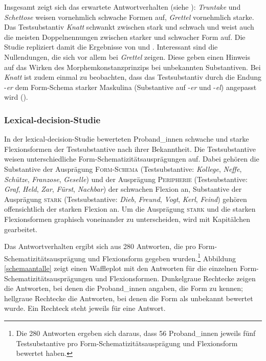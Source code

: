 \begin{sloppypar}
Insgesamt zeigt sich das erwartete Antwortverhalten (siehe ): \textit{Truntake} und \textit{Schettose} weisen vornehmlich schwache Formen auf, \textit{Grettel} vornehmlich starke. Das Testsubstantiv \textit{Knatt} schwankt zwischen stark und schwach und weist auch die meisten Doppelnennungen zwischen starker und schwacher Form auf. Die Studie repliziert damit die Ergebnisse von \textcite{Kopcke.2000b} und \textcite{Schmitt.2019}. Interessant sind die Nullendungen, die sich vor allem bei \textit{Grettel} zeigen. Diese geben einen Hinweis auf das Wirken des Morphemkonstanzprinzips bei unbekannten Substantiven. Bei \textit{Knatt} ist zudem einmal zu beobachten, dass das Testsubstantiv durch die Endung -\textit{er} dem Form-Schema starker Maskulina (Substantive auf -\textit{er} und -\textit{el}) angepasst wird (\cite[167--168]{Schmitt.2019}).
\end{sloppypar}

\subsubsection{Lexical-decision-Studie}\label{ergschemadecant}

In der lexical-decision-Studie bewerteten Proband\_innen schwache und starke Flexionsformen der Testsubstantive nach ihrer Bekanntheit. Die Testsubstantive weisen unterschiedliche Form-Schematizitätsausprägungen auf. Dabei gehören die Substantive der Ausprägung \textsc{Form-Schema} (Testsubstantive: \textit{Kollege}, \textit{Neffe}, \textit{Schütze}, \textit{Franzose}, \textit{Geselle}) und der Ausprägung \textsc{Peripherie} (Testsubstantive: \textit{Graf}, \textit{Held}, \textit{Zar}, \textit{Fürst}, \textit{Nachbar}) der schwachen Flexion an, Substantive der Ausprägung \textsc{stark} (Testsubstantive: \textit{Dieb}, \textit{Freund}, \textit{Vogt}, \textit{Kerl}, \textit{Feind}) gehören offensichtlich der starken Flexion an. Um die Ausprägung \textsc{stark} und die starken Flexionsformen graphisch voneinander zu unterscheiden, wird mit Kapitälchen gearbeitet. 


Das Antwortverhalten ergibt sich aus 280 Antworten, die pro Form-Sche\-ma\-ti\-zi\-täts\-aus\-prä\-gung und Flexionsform gegeben wurden.\footnote{Die 280 Antworten ergeben sich daraus, dass 56 Proband\_innen jeweils fünf Testsubstantive pro Form-Schematizitätsausprägung und Flexionsform bewertet haben.} Abbildung \ref{schemaantalle} zeigt einen Waffleplot mit den Antworten für die einzelnen Form-Sche\-ma\-ti\-zi\-täts\-aus\-prä\-gun\-gen und Flexionsformen. Dunkelgraue Rechtecke zeigen die Antworten, bei denen die Proband\_innen angaben, die Form zu kennen; hellgraue Rechtecke die Antworten, bei denen die Form als unbekannt bewertet wurde. Ein Rechteck steht jeweils für eine Antwort.

